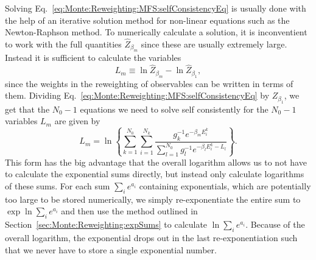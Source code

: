 Solving Eq.~\eqref{eq:Monte:Reweighting:MFS:selfConsistencyEq} is usually done with the help of an iterative solution method for non-linear
equations such as the Newton-Raphson method. To numerically calculate a solution, it is inconventient to work with the full quantities $\hat{Z}_{\beta_m}$
since these are usually extremely large. Instead it is sufficient to calculate the variables
\begin{equation}
    \label{eq:Monte:Reweighting:MFS:logVars}
    L_m \equiv \ln \hat{Z}_{\beta_m} - \ln \hat{Z}_{\beta_1},
\end{equation}
since the weights in the reweighting of observables can be written in terms of them. Dividing Eq.~\eqref{eq:Monte:Reweighting:MFS:selfConsistencyEq} by $Z_{\beta_1}$,
we get that the $N_0-1$ equations we need to solve self consistently for the $N_0-1$ variables $L_m$ are given by
\begin{equation}
    \label{eq:Monte:Reweighting:MFS:modifiedSelfConsistencyEq}
    L_m = \ln\left\{\sum_{k=1}^{N_0}\sum_{i=1}^{N_k}\frac{g_k^{-1}e^{-\beta_mE_i^k}}{\sum_{l=1}^{N_0}g_l^{-1}e^{-\beta_lE_i^k-L_l}}\right\}.
\end{equation}
This form has the big advantage that the overall logarithm allows us to not have to calculate the exponential sums directly, but instead only calculate logarithms
of these sums. For each sum $\sum_ie^{a_i}$ containing exponentials, which are potentially too large to be stored numerically, we simply re-exponentiate the entire
sum to $\exp\ln\sum_ie^{a_i}$ and then use the method outlined in Section~\ref{sec:Monte:Reweighting:expSums} to calculate $\ln\sum_ie^{a_i}$. Because of the
overall logarithm, the exponential drops out in the last re-exponentiation such that we never have to store a single exponential number.

